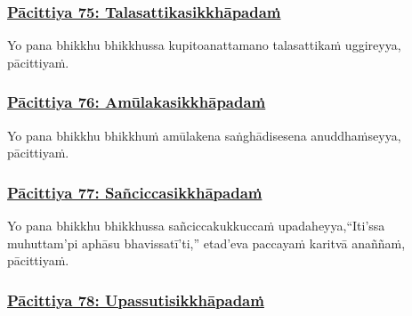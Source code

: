 \subsubsection*{\hyperref[exp75]{Pācittiya 75: Talasattikasikkhāpadaṁ}}
\label{pac75}

Yo pana bhikkhu bhikkhussa kupito\makeatletter\hyperlink{endnote401-appendix}\makeatother \thinspace anattamano talasattikaṁ uggireyya, pācittiyaṁ.



\subsubsection*{\hyperref[exp76]{Pācittiya 76: Amūlakasikkhāpadaṁ}}
\label{pac76}

Yo pana bhikkhu bhikkhuṁ amūlakena saṅghādisesena anuddhaṁseyya, pācittiyaṁ.



\subsubsection*{\hyperref[exp77]{Pācittiya 77: Sañciccasikkhāpadaṁ}}
\label{pac77}

Yo pana bhikkhu bhikkhussa sañcicca\makeatletter\hyperlink{endnote402-appendix}\makeatother \thinspace kukkuccaṁ upadaheyya,\makeatletter\hyperlink{endnote403-appendix}\makeatother \thinspace ``Iti'ssa muhuttam'pi aphāsu bhavissatī'ti,'' etad'eva paccayaṁ karitvā anaññaṁ, pācittiyaṁ.



\subsubsection*{\hyperref[exp78]{Pācittiya 78: Upassutisikkhāpadaṁ}}
\label{pac78}

